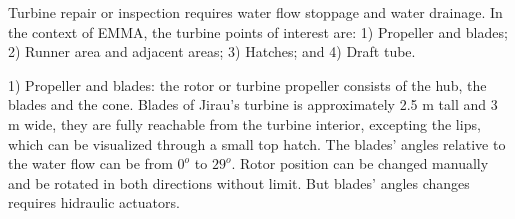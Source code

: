 Turbine repair or inspection requires water flow stoppage and water drainage.
In the context of EMMA, the turbine points of interest are: 1) Propeller and
blades; 2) Runner area and adjacent areas; 3) Hatches; and 4) Draft tube.%


1) Propeller and blades: the rotor or turbine propeller consists of the hub, the
blades and the cone. Blades of Jirau's turbine is approximately 2.5 m tall
and 3 m wide, they are fully reachable from the turbine interior, excepting
the lips, which can be visualized through a small top hatch. The blades' angles
relative to the water flow can be from $0^o$ to $29^o$.
Rotor position can be changed manually and be rotated in both directions without
limit. But blades' angles changes requires hidraulic actuators.


